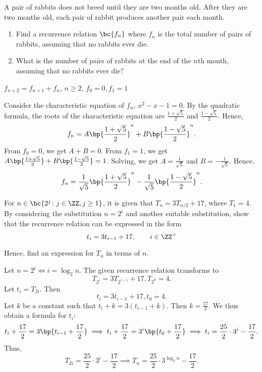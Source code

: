 \clearpage
\begin{problem}
    A pair of rabbits does not breed until they are two months old. After they are two months old, each pair of rabbit produces another pair each month.

    \begin{enumerate}
        \item Find a recurrence relation $\bc{f_n}$ where $f_n$ is the total number of pairs of rabbits, assuming that no rabbits ever die.
        \item What is the number of pairs of rabbits at the end of the $n$th month, assuming that no rabbits ever die?
    \end{enumerate}
\end{problem}
\begin{solution}
    \begin{ppart}
        $f_{n+2} = f_{n+1} + f_n$, $n \geq 2$, $f_0 = 0, f_1 = 1$
    \end{ppart}
    \begin{ppart}
        Consider the characteristic equation of $f_n$, $x^2 - x - 1 = 0$. By the quadratic formula, the roots of the characteristic equation are $\frac{1 + \sqrt5}{2}$ and $\frac{1 - \sqrt5}{2}$. Hence, \[f_n = A \bp{\frac{1 + \sqrt5}{2}}^n + B \bp{\frac{1 - \sqrt5}{2}}^n.\] From $f_0 = 0$, we get $A + B = 0$. From $f_1 = 1$, we get $A \bp{\frac{1 + \sqrt5}2} + B \bp{\frac{1 - \sqrt5}2} = 1$. Solving, we get $A = \frac1{\sqrt5}$ and $B = -\frac1{\sqrt5}$. Hence, \[f_n = \frac1{\sqrt5} \bp{\frac{1 + \sqrt5}{2}}^n - \frac1{\sqrt5} \bp{\frac{1 - \sqrt5}{2}}^n.\]
    \end{ppart}
\end{solution}

\begin{problem}
    For $n \in \bc{2^j \colon j \in \ZZ, j \geq 1}$, it is given that $T_n = 3T_{n/2} + 17$, where $T_1 = 4$. By considering the substitution $n = 2^i$ and another suitable substitution, show that the recurrence relation can be expressed in the form
    \[
        t_i = 3t_{i-1} + 17, \qquad i \in \ZZ^+
    \]
    
    Hence, find an expression for $T_n$ in terms of $n$.
\end{problem}
\begin{solution}
        Let $n = 2^i \iff i = \log_2{n}$. The given recurrence relation transforms to \[T_{2^i} = 3T_{2^{i-1}} + 17, T_{2^0} = 4.\] Let $t_i = T_{2i}$. Then \[t_i = 3t_{i-1} + 17, t_0 = 4.\] Let $k$ be a constant such that $t_i + k = 3(t_{i-1} + k)$. Then $k = \frac{17}2$. We thus obtain a formula for $t_i$: \[t_i + \frac{17}2 = 3\bp{t_{i-1} + \frac{17}2} \implies t_i + \frac{17}{2} = 3^i \bp{t_0 + \frac{17}{2}} \implies t_i = \frac{25}{2} \cdot 3^i - \frac{17}{2}.\] Thus, \[T_{2i} = \frac{25}{2} \cdot 3^i - \frac{17}{2} \implies T_n = \frac{25}{2} \cdot 3^{\log_2 n} - \frac{17}2.\]
\end{solution}

